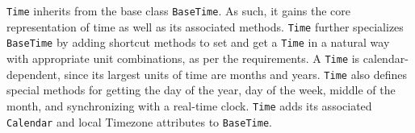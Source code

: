 
{\tt Time} inherits from the base class {\tt BaseTime}.  As such, it gains
the core representation of time as well as its associated methods.
{\tt Time} further specializes {\tt BaseTime} by adding shortcut methods
to set and get a {\tt Time} in a natural way with appropriate unit
combinations, as per the requirements.  A {\tt Time} is calendar-dependent,
since its largest units of time are months and years.  {\tt Time} also
defines special methods for getting the day of the year, day of the week,
middle of the month, and synchronizing with a real-time clock.  {\tt Time}
adds its associated {\tt Calendar} and local Timezone attributes to
{\tt BaseTime}.

